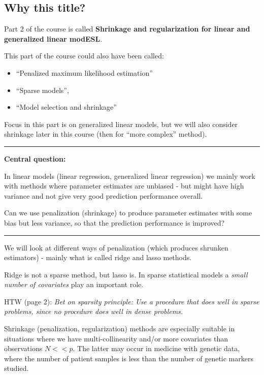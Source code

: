 \documentclass[
  letterpaper,
  DIV=11,
  numbers=noendperiod]{scrartcl}
\providecommand{\tightlist}{%
  \setlength{\itemsep}{0pt}\setlength{\parskip}{0pt}}\usepackage{longtable,booktabs,array}
\begin{document}
\hypertarget{why-this-title}{%
\subsection{Why this title?}\label{why-this-title}}

Part 2 of the course is called \textbf{Shrinkage and regularization for
linear and generalized linear modESL}.

This part of the course could also have been called:

\begin{itemize}
\tightlist
\item
  ``Penalized maximum likelihood estimation''
\item
  ``Sparse models'',
\item
  ``Model selection and shrinkage''
\end{itemize}

Focus in this part is on generalized linear models, but we will also
consider shrinkage later in this course (then for ``more complex''
method).

\begin{center}\rule{0.5\linewidth}{0.5pt}\end{center}

\textbf{Central question:}

In linear models (linear regression, generalized linear regression) we
mainly work with methods where parameter estimates are unbiased - but
might have high variance and not give very good prediction performance
overall.

Can we use penalization (shrinkage) to produce parameter estimates with
some bias but less variance, so that the prediction performance is
improved?

\begin{center}\rule{0.5\linewidth}{0.5pt}\end{center}

We will look at different ways of penalization (which produces shrunken
estimators) - mainly what is called ridge and lasso methods.

Ridge is not a sparse method, but lasso is. In sparse statistical models
a \emph{small number of covariates} play an important role.

HTW (page 2): \emph{Bet on sparsity principle: Use a procedure that does
well in sparse problems, since no procedure does well in dense
problems.}

Shrinkage (penalization, regularization) methods are especially suitable
in situations where we have multi-collinearity and/or more covariates
than observations \(N<<p\). The latter may occur in medicine with
genetic data, where the number of patient samples is less than the
number of genetic markers studied.
\end{document}
